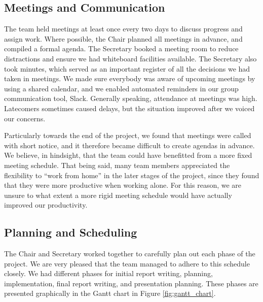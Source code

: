 \subsection{Meetings and Communication}
\label{sec:meetings}
The team held meetings at least once every two days to discuss progress and assign work. Where possible, the Chair planned all meetings in advance, and compiled a formal agenda. The Secretary booked a meeting room to reduce distractions and ensure we had whiteboard facilities available. The Secretary also took minutes, which served as an important register of all the decisions we had taken in meetings. We made sure everybody was aware of upcoming meetings by using a shared calendar, and we enabled automated reminders in our group communication tool, Slack. Generally speaking, attendance at meetings was high. Latecomers sometimes caused delays, but the situation improved after we voiced our concerns. 

Particularly towards the end of the project, we found that meetings were called with short notice, and it therefore became difficult to create agendas in advance. We believe, in hindsight, that the team could have benefitted from a more fixed meeting schedule. That being said, many team members appreciated the flexibility to “work from home” in the later stages of the project, since they found that they were more productive when working alone. For this reason, we are unsure to what extent a more rigid meeting schedule would have actually improved our productivity.

\subsection{Planning and Scheduling}
The Chair and Secretary worked together to carefully plan out each phase of the project. We are very pleased that the team managed to adhere to this schedule closely. We had different phases for initial report writing, planning, implementation, final report writing, and presentation planning. These phases are presented graphically in the Gantt chart in Figure \ref{fig:gantt_chart}.

